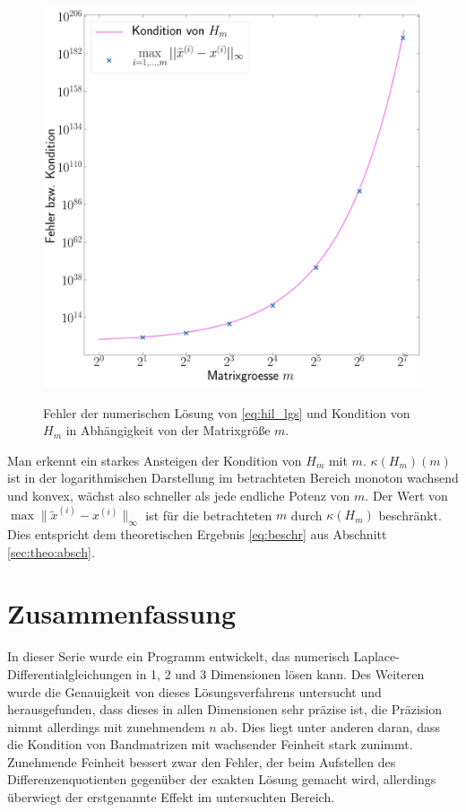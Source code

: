 \documentclass[smallheadings]{scrartcl}
\numberwithin{equation}{section}
\begin{document}
\begin{figure}[H]
\centering
\includegraphics[width=.8\textwidth]{Bericht/Bilder/hil_kond_fehl}
\label{fig:hil_kond_fehl}
\caption{Fehler der numerischen Lösung von \eqref{eq:hil_lgs} und Kondition von $H_m$ in Abhängigkeit von der Matrixgröße $m$.}
\end{figure}

Man erkennt ein starkes Ansteigen der Kondition von $H_m$ mit $m$. $\kappa(H_m)(m)$ ist in der logarithmischen Darstellung im betrachteten Bereich monoton wachsend und konvex, wächst also schneller als jede endliche Potenz von $m$. Der Wert von $\max\|\tilde{x}^{(i)}-x^{(i)}\|_\infty$ ist für die betrachteten $m$ durch $\kappa(H_m)$ beschränkt. Dies entspricht dem theoretischen Ergebnis \eqref{eq:beschr} aus Abschnitt \ref{sec:theo:absch}.


\section{Zusammenfassung}

In dieser Serie wurde ein Programm entwickelt, das numerisch Laplace-Differentialgleichungen in 1, 2 und 3 Dimensionen lösen kann. Des Weiteren wurde die Genauigkeit von dieses Lösungsverfahrens untersucht und herausgefunden, dass dieses in allen Dimensionen sehr präzise ist, die Präzision nimmt allerdings mit zunehmendem $n$ ab. Dies liegt unter anderen daran, dass die Kondition von Bandmatrizen mit wachsender Feinheit stark zunimmt. Zunehmende Feinheit bessert zwar den Fehler, der beim Aufstellen des Differenzenquotienten gegenüber der exakten Lösung gemacht wird, allerdings überwiegt der erstgenannte Effekt im untersuchten Bereich.
\end{document}
